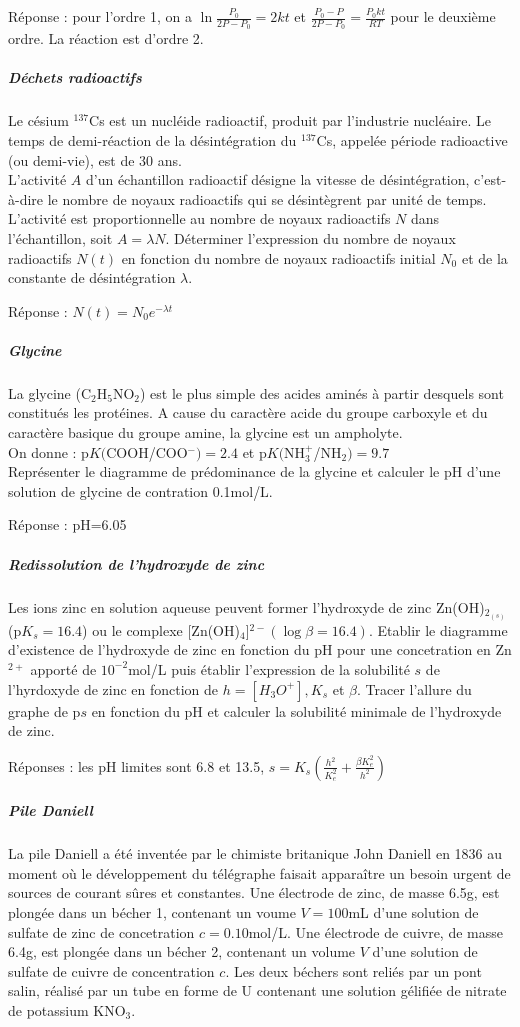 \documentclass[a4paper, 11pt, french]{article}
\newcommand{\be}{\beta}
\newcommand{\la}{\lambda}
\begin{document}
		Réponse : pour l'ordre 1, on a $\ln{\frac{P_0}{2P-P_0}}=2kt$ et $\frac{P_0-P}{2P-P_0}=\frac{P_0kt}{RT}$ pour le deuxième ordre. La réaction est d'ordre 2.

\newpage

		\subparagraph{Déchets radioactifs \\}
	Le césium $^{137}$Cs est un nucléide radioactif, produit par l'industrie nucléaire. Le temps de demi-réaction de la désintégration du $^{137}$Cs, appelée période radioactive (ou demi-vie), est de 30 ans. \\
	L'activité $A$ d'un échantillon radioactif désigne la vitesse de désintégration, c'est-à-dire le nombre de noyaux radioactifs qui se désintègrent par unité de temps. L'activité est proportionnelle au nombre de noyaux radioactifs $N$ dans l'échantillon, soit $A=\la N$. Déterminer l'expression du nombre de noyaux radioactifs $N(t)$ en fonction du nombre de noyaux radioactifs initial $N_0$ et de la constante de désintégration $\la$.


		Réponse : $N(t)=N_0e^{-\la t}$

		\subparagraph{Glycine \\}
	La glycine (C$_2$H$_5$NO$_2$)  est le plus simple des acides aminés à partir desquels sont constitués les protéines. A cause du caractère acide du groupe carboxyle et du caractère basique du groupe amine, la glycine est un ampholyte.\\
	On donne : p$K($COOH/COO$^-)=2.4$ et p$K($NH$_3^+$/NH$ _2)=9.7$ \\
	Représenter le diagramme de prédominance de la glycine et calculer le pH d'une solution de glycine de contration 0.1mol/L.


		Réponse : pH=6.05

		\subparagraph{Redissolution de l'hydroxyde de zinc \\}
	Les ions zinc en solution aqueuse peuvent former l'hydroxyde de zinc Zn(OH)$_{2_(s)}$ (p$K_s=16.4$) ou le complexe [Zn(OH)$_4$]$^{2-} (\log \be =16.4)$. Etablir le diagramme d'existence de l'hydroxyde de zinc en fonction du pH pour une concetration en Zn$^{2+}$ apporté de $10^{-2}$mol/L puis établir l'expression de la solubilité $s$ de l'hyrdoxyde de zinc en fonction de $h=[H_3O^+], K_s$ et $\be$. Tracer l'allure du graphe de p$s$ en fonction du pH et calculer la solubilité minimale de l'hydroxyde de zinc.


		Réponses : les pH limites sont 6.8 et 13.5, $s=K_s(\frac{h^2}{K_e^2}+\frac{\be K_e^2}{h^2})$

		\subparagraph{Pile Daniell \\}
	La pile Daniell a été inventée par le chimiste britanique John Daniell en 1836 au moment où le développement du télégraphe faisait apparaître un besoin urgent de sources de courant sûres et constantes. Une électrode de zinc, de masse 6.5g, est plongée dans un bécher 1, contenant un voume $V=100$mL d'une solution de sulfate de zinc de concetration $c=0.10$mol/L. Une électrode de cuivre, de masse 6.4g, est plongée dans un bécher 2, contenant un volume $V$ d'une solution de sulfate de cuivre de concentration $c$. Les deux béchers sont reliés par un pont salin, réalisé par un tube en forme de U contenant une solution gélifiée de nitrate de potassium KNO$_3$.
\end{document}
